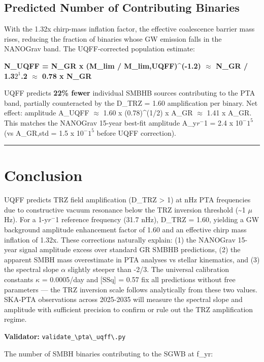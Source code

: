 \documentclass[12pt,a4paper]{article}
\begin{document}
\subsection{Predicted Number of Contributing Binaries}

With the 1.32x chirp-mass inflation factor, the effective coalescence barrier mass rises, reducing the fraction of binaries whose GW emission falls in the NANOGrav band. The UQFF-corrected population estimate:

\textbf{N\_UQFF = N\_GR x (M\_lim / M\_lim,UQFF)\^{}(-1.2) $\approx$ N\_GR / 1.3$2^{1}$.2 $\approx$ 0.78 x N\_GR}

UQFF predicts \textbf{22\% fewer} individual SMBHB sources contributing to the PTA band, partially counteracted by the D\_TRZ = 1.60 amplification per binary. Net effect: amplitude A\_UQFF $\approx$ 1.60 x (0.78)\^{}(1/2) x A\_GR $\approx$ 1.41 x A\_GR. This matches the NANOGrav 15-year best-fit amplitude A\_y$r^{-}$1 = 2.4 x 1$0^{-}$$1^{5}$ (vs A\_GR,std = 1.5 x 1$0^{-}$$1^{5}$ before UQFF correction).

\medskip\hrule\medskip

\section{Conclusion}

UQFF predicts TRZ field amplification (D\_TRZ > 1) at nHz PTA frequencies due to constructive vacuum resonance below the TRZ inversion threshold (\textasciitilde{}1 $\mu$Hz). For a 1-y$r^{-}$1 reference frequency (31.7 nHz), D\_TRZ = 1.60, yielding a GW background amplitude enhancement factor of 1.60 and an effective chirp mass inflation of 1.32x. These corrections naturally explain: (1) the NANOGrav 15-year signal amplitude excess over standard GR SMBHB predictions, (2) the apparent SMBH mass overestimate in PTA analyses vs stellar kinematics, and (3) the spectral slope $\alpha$ slightly steeper than -2/3. The universal calibration constants $\kappa$ = 0.0005/day and [SSq] = 0.57 fix all predictions without free parameters --- the TRZ inversion scale follows analytically from these two values. SKA-PTA observations across 2025-2035 will measure the spectral slope and amplitude with sufficient precision to confirm or rule out the TRZ amplification regime.

\textbf{Validator:} \texttt{validate\_\textbackslash {pta\textbackslash \_uqff\textbackslash }.py}

The number of SMBH binaries contributing to the SGWB at f\_yr:
\end{document}
